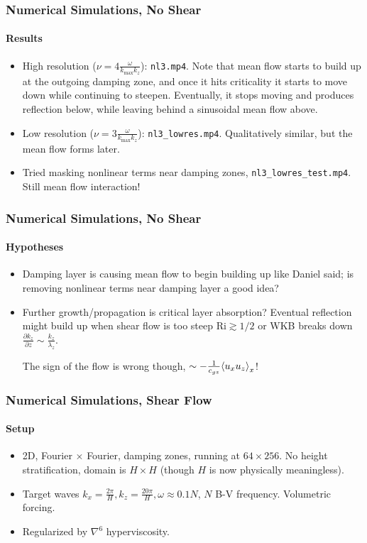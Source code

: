 \documentclass[dvipsnames]{beamer}
\newcommand*{\pd}[2]{\frac{\partial#1}{\partial#2}}
\DeclarePairedDelimiter\ev{\langle}{\rangle}
\begin{document}
\begin{frame}
    \frametitle{Numerical Simulations, No Shear}
    \framesubtitle{Results}

    \begin{itemize}
        \item High resolution ($\nu = 4\frac{\omega}{k_{\max}k_z}$):
            \lstinline{nl3.mp4}. Note that mean flow starts to build up at the
            outgoing damping zone, and once it hits criticality it starts to
            move down while continuing to steepen. Eventually, it stops moving
            and produces reflection below, while leaving behind a sinusoidal
            mean flow above.

        \item Low resolution ($\nu = 3\frac{\omega}{k_{\max}k_z}$):
            \lstinline{nl3_lowres.mp4}. Qualitatively similar, but the mean flow
            forms later.

        \item Tried masking nonlinear terms near damping zones,
            \lstinline{nl3_lowres_test.mp4}. Still mean flow interaction!
    \end{itemize}
\end{frame}

\begin{frame}
    \frametitle{Numerical Simulations, No Shear}
    \framesubtitle{Hypotheses}
    \begin{itemize}
        \item Damping layer is causing mean flow to begin building up
            like Daniel said; is removing nonlinear terms near damping layer a
            good idea?

        \item Further growth/propagation is critical layer absorption?
            Eventual reflection might build up when shear flow is too
            steep $\mathrm{Ri} \gtrsim 1/2$ or WKB breaks down
            $\pd{k_z}{z} \sim \frac{k_z}{\lambda_z}$.

            The sign of the flow is
            wrong though, $\sim -\frac{1}{c_{gz}}\ev*{u_xu_z}_x$!
    \end{itemize}
\end{frame}

\begin{frame}
    \frametitle{Numerical Simulations, Shear Flow}
    \framesubtitle{Setup}

    \begin{itemize}
        \item 2D, Fourier $\times$ Fourier, damping zones, running at $64 \times
            256$. No height stratification, domain is $ H \times H$ (though $H$
            is now physically meaningless).

        \item Target waves $k_x = \frac{2\pi}{H}, k_z = \frac{20\pi}{H}, \omega
            \approx 0.1N$, $N$ B-V frequency. Volumetric forcing.

        \item Regularized by $\nabla^6$ hyperviscosity.
    \end{itemize}
\end{frame}
\end{document}

